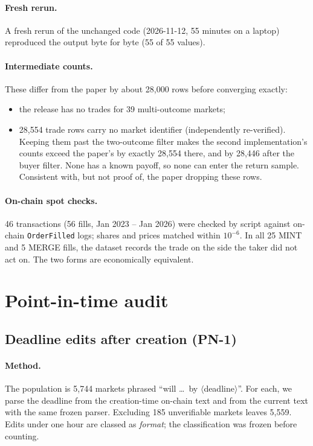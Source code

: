 \documentclass[10pt]{article}
\newcommand{\code}[1]{\texttt{#1}}
\begin{document}
\paragraph{Fresh rerun.} A fresh rerun of the unchanged code (2026-11-12, 55
minutes on a laptop) reproduced the output byte for byte (55 of 55 values).

\paragraph{Intermediate counts.} These differ from the paper by about 28,000
rows before converging exactly:
\begin{itemize}[nosep]
  \item the release has no trades for 39 multi-outcome markets;
  \item 28,554 trade rows carry no market identifier (independently
        re-verified). Keeping them past the two-outcome filter makes the
        second implementation's counts exceed the paper's by exactly 28,554
        there, and by 28,446 after the buyer filter. None has a known payoff,
        so none can enter the return sample. Consistent with, but not proof
        of, the paper dropping these rows.
\end{itemize}

\paragraph{On-chain spot checks.} 46 transactions (56 fills, Jan 2023 -- Jan
2026) were checked by script against on-chain \code{OrderFilled} logs; shares
and prices matched within $10^{-6}$. In all 25 MINT and 5 MERGE fills, the
dataset records the trade on the side the taker did not act on. The two forms
are economically equivalent.

\section{Point-in-time audit}

\subsection{Deadline edits after creation (PN-1)}

\paragraph{Method.} The population is 5,744 markets phrased ``will \ldots\ by
$\langle$deadline$\rangle$''. For each, we parse the deadline from the
creation-time on-chain text and from the current text with the same frozen
parser. Excluding 185 unverifiable markets leaves 5,559. Edits under one hour
are classed as \emph{format}; the classification was frozen before counting.
\end{document}
